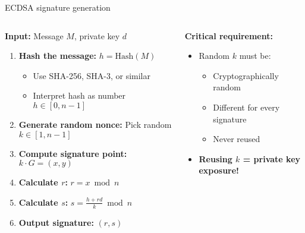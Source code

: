 \documentclass[aspectratio=169, lualatex, handout]{beamer}
\begin{document}
\begin{frame}{ECDSA signature generation}
	\begin{columns}
		\begin{column}{0.6\textwidth}
			\textbf{Input:} Message $M$, private key $d$
			\begin{enumerate}[<+->]
				\item \textbf{Hash the message:} $h = \text{Hash}(M)$
				      \begin{itemize}
					      \item Use SHA-256, SHA-3, or similar
					      \item Interpret hash as number $h \in [0, n-1]$
				      \end{itemize}
				\item \textbf{Generate random nonce:} Pick random $k \in [1, n-1]$
				\item \textbf{Compute signature point:} $k \cdot G = (x, y)$
				\item \textbf{Calculate $r$:} $r = x \bmod n$
				\item \textbf{Calculate $s$:} $s = \frac{h + rd}{k} \bmod n$
				\item \textbf{Output signature:} $(r, s)$
			\end{enumerate}
		\end{column}
		\begin{column}{0.4\textwidth}
			\textbf{Critical requirement:}
			\begin{itemize}[<+->]
				\item Random $k$ must be:
				      \begin{itemize}
					      \item Cryptographically random
					      \item Different for every signature
					      \item Never reused
				      \end{itemize}
				\item \textbf{Reusing $k$ = private key exposure!}
			\end{itemize}
		\end{column}
	\end{columns}
\end{frame}
\end{document}
